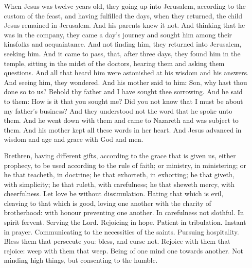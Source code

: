 \begin{multicols}{2}
When Jesus was twelve years old, they going up into Jerusalem, according to
the custom of the feast, and having fulfilled the days, when they returned, the
child Jesus remained in Jerusalem. And his parents knew it not.  And thinking
that he was in the company, they came a day's journey and sought him among
their kinsfolks and acquaintance.  And not finding him, they returned into
Jerusalem, seeking him.  And it came to pass, that, after three days, they
found him in the temple, sitting in the midst of the doctors, hearing them and
asking them questions.  And all that heard him were astonished at his wisdom
and his answers.  And seeing him, they wondered. And his mother said to him:
Son, why hast thou done so to us? Behold thy father and I have sought thee
sorrowing.  And he said to them: How is it that you sought me? Did you not know
that I must be about my father's business?  And they understood not the word
that he spoke unto them.  And he went down with them and came to Nazareth and
was subject to them. And his mother kept all these words in her heart.  And
Jesus advanced in wisdom and age and grace with God and men.



\bigskip



Brethren, having different gifts, according to the grace that is given us, either
prophecy, to be used according to the rule of faith; or ministry, in
ministering; or he that teacheth, in doctrine; he that exhorteth, in exhorting;
he that giveth, with simplicity; he that ruleth, with carefulness; he that
sheweth mercy, with cheerfulness.  Let love be without dissimulation. Hating
that which is evil, cleaving to that which is good, loving one another with the
charity of brotherhood: with honour preventing one another.  In carefulness not
slothful. In spirit fervent. Serving the Lord.  Rejoicing in hope. Patient in
tribulation. Instant in prayer.  Communicating to the necessities of the
saints. Pursuing hospitality.  Bless them that persecute you: bless, and curse
not.  Rejoice with them that rejoice: weep with them that weep.  Being of one
mind one towards another. Not minding high things, but consenting to the
humble.%




\end{multicols}
